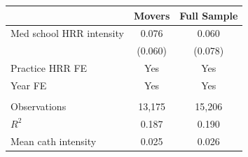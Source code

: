 
\begin{tabular}{lcc}
\toprule
 & Movers & Full Sample\\
\midrule
Med school HRR intensity & 0.076 & 0.060\\
 & (0.060) & (0.078)\\
\addlinespace
Practice HRR FE & Yes & Yes\\
Year FE & Yes & Yes\\
\midrule\\
Observations & 13,175 & 15,206\\
$R^2$ & 0.187 & 0.190\\
Mean cath intensity & 0.025 & 0.026\\
\bottomrule
\end{tabular}
